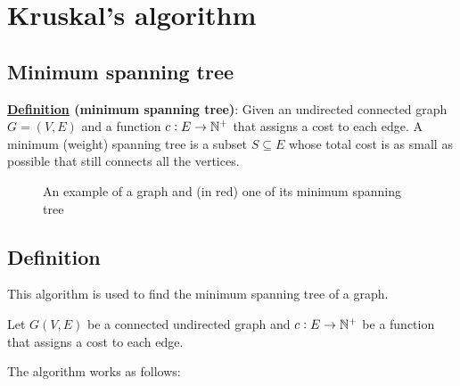 \documentclass[12pt]{extarticle}
\begin{document}
\section{Kruskal's algorithm}

\subsection{Minimum spanning tree}

\textbf{\underline{Definition} (minimum spanning tree)}: Given an undirected connected graph $G = (V, E)$ and a function $c: E \to \mathbb{N}^+$ that assigns a cost to each edge. A minimum (weight) spanning tree is a subset $S \subseteq E$ whose total cost is as small as possible that still connects all the vertices.

\begin{figure}[H]
    \centering
    \caption{An example of a graph and (in red) one of its minimum spanning tree}
    \label{fig:minimum_spanning_tree}
\end{figure}

\subsection{Definition}

This algorithm is used to find the minimum spanning tree of a graph.

Let $G(V,E)$ be a connected undirected graph and $c: E \to \mathbb{N}^+$ be a function that assigns a cost to each edge.

The algorithm works as follows:
\end{document}
